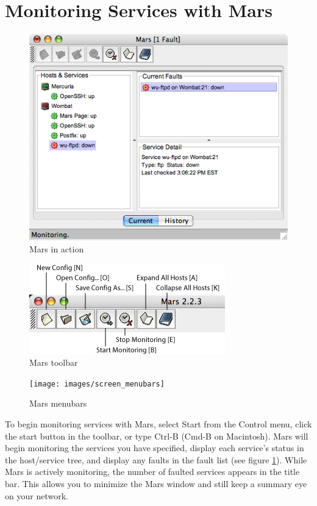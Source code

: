 \documentclass{article}
\newcommand{\guiitem}[1]{{\sf #1}}
\newcommand{\keystroke}[1]{{\sf #1}}
\begin{document}
\section{Monitoring Services with Mars}
\begin{figure}
\begin{center}
\includegraphics[scale=0.5]{images/screen_monitoring}
\end{center}
\caption{Mars in action}
\label{fig_screen_monitoring}
\end{figure} 
\begin{figure}
\begin{center}
\includegraphics[scale=0.5]{images/screen_toolbar}
\end{center}
\caption{Mars toolbar}
\label{fig_screen_toolbar}
\end{figure} 
\begin{figure}
\begin{center}
\texttt{[image: images/screen\_menubars]}
\end{center}
\caption{Mars menubars}
\label{fig_screen_menubars}
\end{figure} 

To begin monitoring services with Mars, select \guiitem{Start} from
the \guiitem{Control} menu, click the start button in the toolbar, or
type \keystroke{Ctrl-B} (\keystroke{Cmd-B} on Macintosh).  Mars will
begin monitoring the services you have specified, display each
service's status in the host/service tree, and display any faults in
the fault list (see figure \ref{fig_screen_monitoring}).  While Mars
is actively monitoring, the number of faulted services appears in the
title bar. This allows you to minimize the Mars window and still keep
a summary eye on your network.
 
\end{document}

